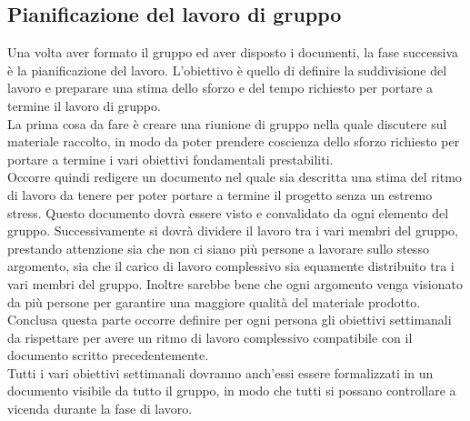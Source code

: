 \documentclass[11pt,a4paper]{article}
\begin{document}
	\subsection{Pianificazione del lavoro di gruppo} 
	Una volta aver formato il gruppo ed aver disposto i documenti, la fase successiva è la pianificazione del lavoro.  L'obiettivo è quello di definire la suddivisione del lavoro e preparare una stima dello sforzo e del tempo richiesto per portare a termine il lavoro di gruppo.\\
	La prima cosa da fare è creare una riunione di gruppo nella quale discutere sul materiale raccolto, in modo da poter prendere coscienza dello sforzo richiesto per portare a termine i vari obiettivi fondamentali prestabiliti.\\
	Occorre quindi redigere un documento nel quale sia descritta una stima del ritmo di lavoro da tenere per poter portare a termine il progetto senza un estremo stress. Questo documento dovrà essere visto e convalidato da ogni elemento del gruppo.
	Successivamente  si dovrà dividere il lavoro tra i vari membri del gruppo, prestando attenzione sia che non ci siano più persone a lavorare sullo stesso argomento, sia che il carico di lavoro complessivo sia equamente distribuito tra  i vari membri del gruppo. Inoltre sarebbe bene che ogni argomento venga visionato da più persone per garantire una maggiore qualità del materiale prodotto. Conclusa questa parte occorre definire per ogni persona gli obiettivi settimanali da rispettare per avere un ritmo di lavoro complessivo compatibile con il documento scritto precedentemente.\\
	Tutti i vari obiettivi settimanali dovranno anch'essi essere formalizzati in un documento visibile da tutto il gruppo, in modo che tutti si possano controllare a vicenda durante la fase di lavoro.\\
	
\end{document}
